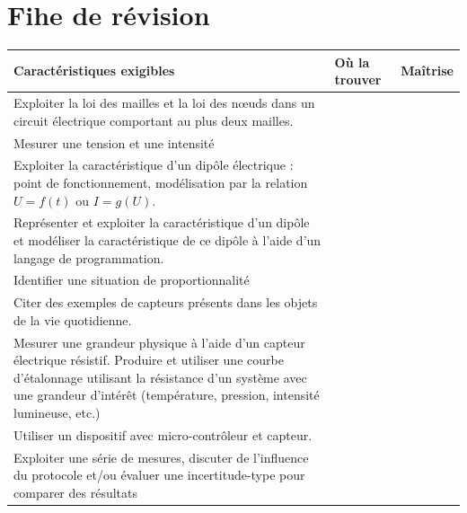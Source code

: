 \documentclass[a4paper,11pt,fleqn]{article}%
\begin{document}
\section*{Fihe de révision}
\begin{tabular}{|m{.6\linewidth}|>{\centering}m{.15\linewidth}|>{\centering\arraybackslash}m{.15\linewidth}|}
	\hline
	\centering \textbf{Caractéristiques exigibles} & \textbf{Où la trouver} & \textbf{Maîtrise}\\
	\hline
	Exploiter la loi des mailles et la loi des n\oe uds dans un circuit électrique comportant au plus deux mailles. & & \\
	\hline
	Mesurer une tension et une intensité & &\\
	\hline
	Exploiter la caractéristique d'un dipôle électrique : point de fonctionnement, modélisation par la relation $U = f(t)$ ou $I = g(U)$. & &\\
	\hline
	Représenter et exploiter la caractéristique d'un dipôle et modéliser la caractéristique de ce dipôle à l'aide d'un langage de programmation. & & \\
	\hline
	Identifier une situation de proportionnalité & &\\
	\hline
	Citer des exemples de capteurs présents dans les objets de la vie quotidienne.& & \\
	\hline 
	Mesurer une grandeur physique à l'aide d'un capteur électrique résistif. Produire et utiliser une courbe d'étalonnage utilisant la résistance d'un système avec une grandeur d'intérêt (température, pression, intensité lumineuse, etc.) & & \\
	\hline
	Utiliser un dispositif avec micro-contrôleur et capteur. & &\\
	Exploiter une série de mesures, discuter de l'influence du protocole et/ou évaluer une incertitude-type pour comparer des résultats &&\\
	\hline
\end{tabular}
\end{document}
